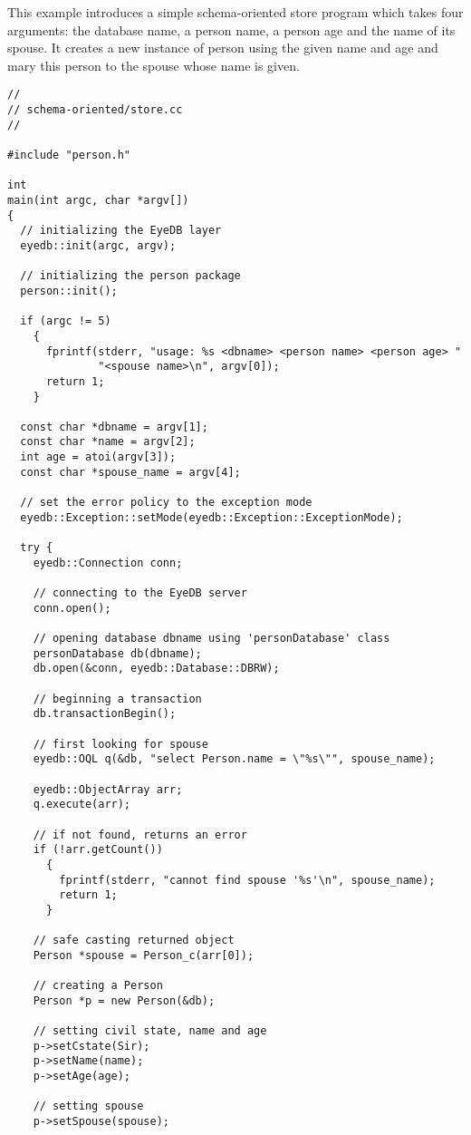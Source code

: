 This example introduces a simple schema-oriented store program which takes
four arguments: the database name, a person name, a person age and the
name of its spouse. It
creates a new instance of person using the given name and age and mary
this person to the spouse whose name is given.
\verbsize
\begin{verbatim}
//
// schema-oriented/store.cc
//

#include "person.h"

int
main(int argc, char *argv[])
{
  // initializing the EyeDB layer
  eyedb::init(argc, argv);

  // initializing the person package
  person::init();

  if (argc != 5)
    {
      fprintf(stderr, "usage: %
              "<spouse name>\n", argv[0]);
      return 1;
    }

  const char *dbname = argv[1];
  const char *name = argv[2];
  int age = atoi(argv[3]);
  const char *spouse_name = argv[4];

  // set the error policy to the exception mode
  eyedb::Exception::setMode(eyedb::Exception::ExceptionMode);

  try {
    eyedb::Connection conn;

    // connecting to the EyeDB server
    conn.open();

    // opening database dbname using 'personDatabase' class
    personDatabase db(dbname);
    db.open(&conn, eyedb::Database::DBRW);

    // beginning a transaction
    db.transactionBegin();

    // first looking for spouse
    eyedb::OQL q(&db, "select Person.name = \"%

    eyedb::ObjectArray arr;
    q.execute(arr);

    // if not found, returns an error
    if (!arr.getCount())
      {
        fprintf(stderr, "cannot find spouse '%
        return 1;
      }

    // safe casting returned object
    Person *spouse = Person_c(arr[0]);

    // creating a Person
    Person *p = new Person(&db);

    // setting civil state, name and age
    p->setCstate(Sir);
    p->setName(name);
    p->setAge(age);

    // setting spouse
    p->setSpouse(spouse);


\end{verbatim}
